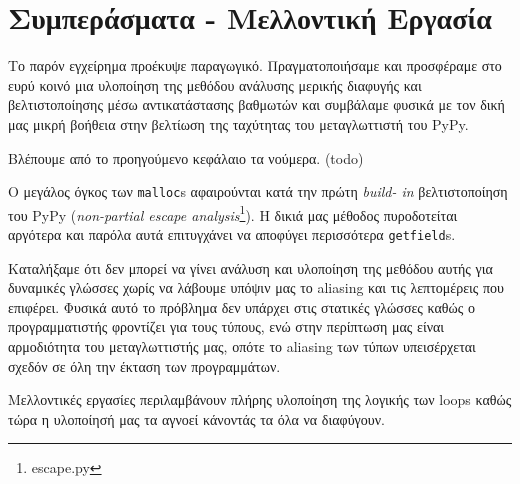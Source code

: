 
\chapter{Συμπεράσματα - Μελλοντική Εργασία}
\label{chapter6} 

Το παρόν εγχείρημα προέκυψε παραγωγικό. Πραγματοποιήσαμε και προσφέραμε στο ευρύ
κοινό μια υλοποίηση της μεθόδου ανάλυσης μερικής διαφυγής και βελτιστοποίησης
μέσω αντικατάστασης βαθμωτών και συμβάλαμε φυσικά με τον δική μας μικρή βοήθεια
στην βελτίωση της ταχύτητας του μεταγλωττιστή του PyPy.

Βλέπουμε από το προηγούμενο κεφάλαιο τα νούμερα. (todo)

Ο μεγάλος όγκος των \texttt{malloc}s αφαιρούνται κατά την πρώτη \textit{build-
in} βελτιστοποίηση του PyPy (\textit{non-partial escape
analysis}\footnote{escape.py}). Η δικιά μας μέθοδος πυροδοτείται αργότερα και
παρόλα αυτά επιτυγχάνει να αποφύγει περισσότερα \texttt{getfield}s.

Καταλήξαμε ότι δεν μπορεί να γίνει ανάλυση και υλοποίηση της μεθόδου αυτής για
δυναμικές γλώσσες χωρίς να λάβουμε υπόψιν μας το aliasing και τις λεπτομέρεις
που επιφέρει. Φυσικά αυτό το πρόβλημα δεν υπάρχει στις στατικές γλώσσες καθώς ο
προγραμματιστής φροντίζει για τους τύπους, ενώ στην περίπτωση μας είναι
αρμοδιότητα του μεταγλωττιστής μας, οπότε το aliasing των τύπων υπεισέρχεται
σχεδόν σε όλη την έκταση των προγραμμάτων.

Μελλοντικές εργασίες περιλαμβάνουν πλήρης υλοποίηση της λογικής των loops
καθώς τώρα η υλοποίησή μας τα αγνοεί κάνοντάς τα όλα να διαφύγουν.
